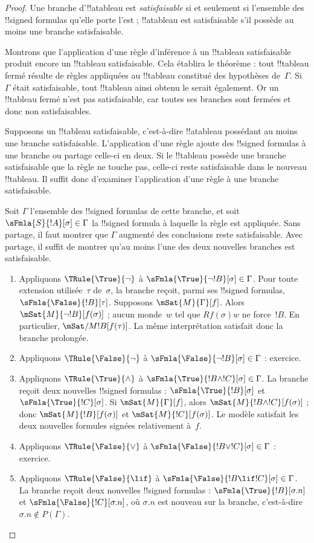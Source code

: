 \documentclass[../../../include/open-logic-section]{subfiles}
\begin{document}
\begin{proof}
Une branche d'!!a{tableau} est \emph{satisfaisable} si et seulement
si l'ensemble des !!{signed formula}s qu'elle porte l'est ;
!!a{tableau} est satisfaisable s'il possède au moins une branche
satisfaisable.

Montrons que l'application d'une règle d'inférence à un !!{tableau}
satisfaisable produit encore un !!{tableau} satisfaisable. Cela
établira le théorème : tout !!{tableau} fermé résulte de règles
appliquées au !!{tableau} constitué des hypothèses de~$\Gamma$. Si
$\Gamma$ était satisfaisable, tout !!{tableau} ainsi obtenu le
serait également. Or un !!{tableau} fermé n'est pas satisfaisable,
car toutes ses branches sont fermées et donc non satisfaisables.

Supposons un !!{tableau} satisfaisable, c'est-à-dire !!a{tableau}
possédant au moins une branche satisfaisable.
L'application d'une règle ajoute des !!{signed formula}s à une
branche ou partage celle-ci en deux. Si le !!{tableau} possède une
branche satisfaisable que la règle ne touche pas, celle-ci reste
satisfaisable dans le nouveau
!!{tableau}. Il suffit donc d'examiner l'application d'une règle à
une branche satisfaisable.

Soit $\Gamma$ l'ensemble des !!{signed formula}s de cette branche,
et soit $\sFmla{S}{!A}[\sigma] \in \Gamma$ la !!{signed formula} à
laquelle la règle est appliquée. Sans partage, il faut montrer que
$\Gamma$ augmenté des conclusions reste satisfaisable. Avec
partage, il suffit de montrer qu'au moins l'une des deux nouvelles
branches est satisfaisable.
\begin{enumerate}
\item Appliquons $\TRule{\True}{\lnot}$ à
  $\sFmla{\True}{\lnot !B}[\sigma] \in \Gamma$. Pour toute
  extension utilisée~$\tau$ de~$\sigma$, la branche reçoit, parmi ses
  !!{signed formula}s,
  $\sFmla{\False}{!B}[\tau]$. Supposons
  $\mSat{M}{\Gamma}[f]$. Alors
  $\mSat{M}{\lnot !B}[f(\sigma)]$ ; aucun monde~$w$ tel que
  $Rf(\sigma)w$ ne force~$!B$. En particulier,
  $\mSat/{M}{!B}[f(\tau)]$. La même interprétation satisfait donc
  la branche prolongée.
\item Appliquons $\TRule{\False}{\lnot}$ à
  $\sFmla{\False}{\lnot !B}[\sigma] \in \Gamma$ : exercice.
\item Appliquons $\TRule{\True}{\land}$ à
  $\sFmla{\True}{!B \land !C}[\sigma] \in \Gamma$. La branche
  reçoit deux nouvelles !!{signed formula}s :
  $\sFmla{\True}{!B}[\sigma]$ et
  $\sFmla{\True}{!C}[\sigma]$. Si
  $\mSat{M}{\Gamma}[f]$, alors
  $\mSat{M}{!B \land !C}[f(\sigma)]$ ; donc
  $\mSat{M}{!B}[f(\sigma)]$ et
  $\mSat{M}{!C}[f(\sigma)]$. Le modèle satisfait les deux nouvelles
  formules signées relativement à~$f$.
\item Appliquons $\TRule{\False}{\lor}$ à
  $\sFmla{\False}{!B \lor !C}[\sigma] \in \Gamma$ : exercice.
\item Appliquons $\TRule{\False}{\lif}$ à
  $\sFmla{\False}{!B \lif !C}[\sigma] \in \Gamma$. La branche
  reçoit deux nouvelles !!{signed formula}s :
  $\sFmla{\True}{!B}[\sigma.n]$ et
  $\sFmla{\False}{!C}[\sigma.n]$, où $\sigma.n$ est nouveau sur la
  branche, c'est-à-dire $\sigma.n \notin P(\Gamma)$.


\end{enumerate}
\end{proof}
\end{document}
